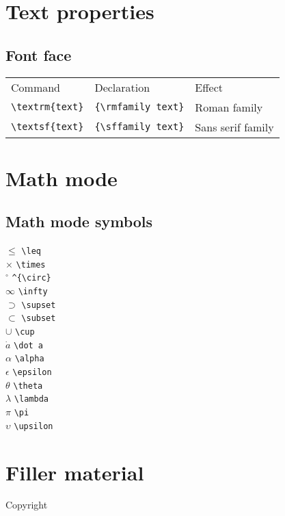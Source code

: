 \documentclass{refsheet}
\begin{document}
\section{Text properties}

\subsection{Font face}

\begin{tabular}{lll}
Command & Declaration & Effect \\
\lstinline|\textrm{text}| & \lstinline|{\rmfamily text}| & \textrm{Roman family} \\
\lstinline|\textsf{text}| & \lstinline|{\sffamily text}| & \textsf{Sans serif family} \\
\end{tabular}

\section{Math mode}

\subsection{Math mode symbols}
\begin{multicols*}{4}
\( \leq \) \verb|\leq| \\
\( \times \) \verb|\times| \\
\( ^{\circ} \) \verb|^{\circ}| \\
\( \infty \) \verb|\infty| \\
\( \supset \) \verb|\supset| \\
\( \subset \) \verb|\subset| \\
\( \cup \) \verb|\cup| \\
\( \dot a \) \verb|\dot a| \\
\( \alpha \) \verb|\alpha| \\
\( \epsilon \) \verb|\epsilon| \\
\( \theta \) \verb|\theta| \\
\( \lambda \) \verb|\lambda| \\
\( \pi \) \verb|\pi| \\
\( \upsilon \) \verb|\upsilon|
\end{multicols*}

\section{Filler material}

\lipsum

\noindent Copyright \textcopyright{} \thedate{} \theauthor{}
\end{document}
